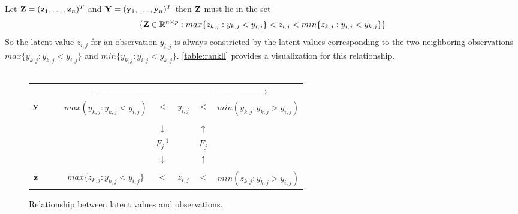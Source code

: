 Let 
$\mathbf{Z} = (\mathbf{z}_1, \dots, \mathbf{z}_n)^T$ and $\mathbf{Y} = (\mathbf{y}_1, \dots, \mathbf{y}_n)^T$
then $\mathbf{Z}$ must lie in the set
\begin{equation}
	\label{ext_rankl_set}
	\{\mathbf{Z}\in \mathbb{R}^{n\times p} : max\{z_{k,j}:y_{k,j}<y_{i,j}\} <z_{i,j} <min\{z_{k,j}:y_{i,j}<y_{k,j}\}  \} 
\end{equation}
So the latent value $z_{i,j}$ for an observation $y_{i,j}$ is always constricted 
by the latent values corresponding to the two neighboring observations $max\{y_{k,j}:y_{k,j}<y_{i,j}\}$  and $min\{y_{k,j}:y_{i,j}<y_{k,j}\}$.
\autoref{table:rankll} provides a visualization for this relationship.
\\
\\
\begin{figure}[H]
	\begin{tcolorbox}[colback=green!5!white,colframe=green!75!black]
		\begin{tabular}{cccccc}
			&\multicolumn{5}{c}{$\xrightarrow{\hspace*{7cm}}$}
			\\
			$\mathbf{y}\quad\quad$ & $max(y_{k,j}:y_{k,j}<y_{i,j})$   & $<$           & $y_{i,j}$                 & $<$         & $min(y_{k,j}: y_{k,j}>y_{i,j})$ 
			\\
			                     &                                  &               &                           &             &                                 
			\\
			\midrule
			                     &                                  & $\downarrow $ & \quad\quad\quad\quad\quad & $\uparrow$  &                                 
			\\
			                     &                                  & $ F_j^{-1}$   & \quad\quad\quad\quad\quad & $ F_j$      &                                 
			\\
			                     &                                  & $\downarrow $ & \quad\quad\quad\quad\quad & $\uparrow $ &                                 
			\\
			\midrule
			                     &                                  &               &                           &             &                                 
			\\
			$\mathbf{z}\quad\quad$ & $max\{z_{k,j}:y_{k,j}<y_{i,j}\}$ & $<$           & $z_{i,j}$                 & $<$         & $min(z_{k,j}: y_{k,j}>y_{i,j})$ 
		\end{tabular}	
				
	\end{tcolorbox}
	\caption{Relationship between latent values and observations.}
	\label{table:rankll}
\end{figure}



